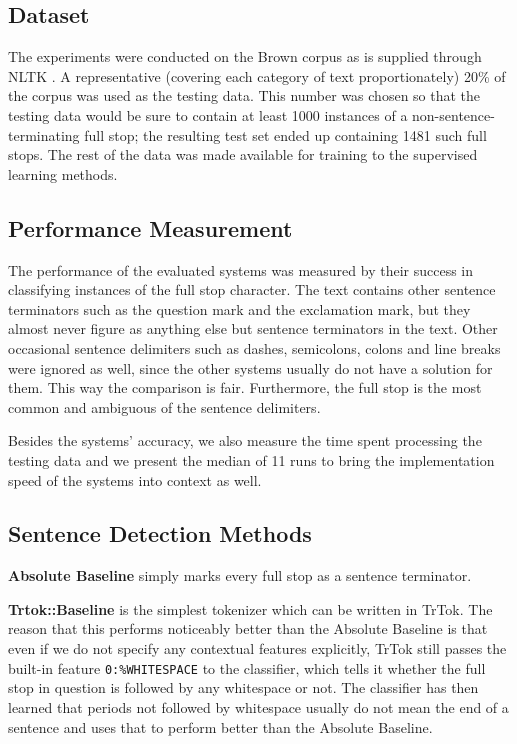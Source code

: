 \subsection{Dataset}

The experiments were conducted on the Brown corpus \cite{data-brown}
as is supplied through NLTK \cite{software-nltk}. A representative
(covering each category of text proportionately) 20\% of the corpus
was used as the testing data. This number was chosen so that the
testing data would be sure to contain at least 1000 instances of a
non-sentence-terminating full stop; the resulting test set ended up
containing 1481 such full stops. The rest of the data was made
available for training to the supervised learning methods.

\subsection{Performance Measurement}

The performance of the evaluated systems was measured by their success
in classifying instances of the full stop character. The text contains
other sentence terminators such as the question mark and the
exclamation mark, but they almost never figure as anything else but
sentence terminators in the text. Other occasional sentence delimiters
such as dashes, semicolons, colons and line breaks were ignored as
well, since the other systems usually do not have a solution for them.
This way the comparison is fair. Furthermore, the full stop is the
most common and ambiguous of the sentence delimiters.

Besides the systems' accuracy, we also measure the time spent
processing the testing data and we present the median of 11 runs to
bring the implementation speed of the systems into context as well.

\subsection{Sentence Detection Methods}

\textbf{Absolute Baseline} simply marks every full stop as a sentence
terminator.

\textbf{Trtok::Baseline} is the simplest tokenizer which can be
written in TrTok. The reason that this performs noticeably better than
the Absolute Baseline is that even if we do not specify any contextual
features explicitly, TrTok still passes the built-in feature
\texttt{0:\%WHITESPACE} to the classifier, which tells it whether the
full stop in question is followed by any whitespace or not. The
classifier has then learned that periods not followed by whitespace
usually do not mean the end of a sentence and uses that to perform
better than the Absolute Baseline.

